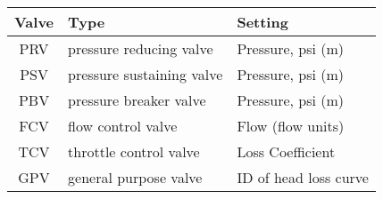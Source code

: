 \begin{tabular}{|c|l|l|}
\hline
Valve& Type& Setting\\
\hline
PRV& pressure reducing valve  & Pressure, psi (m)\\
PSV& pressure sustaining valve& Pressure, psi (m)\\
PBV& pressure breaker valve   & Pressure, psi (m)\\
FCV& flow control valve       & Flow (flow units)\\
TCV& throttle control valve   & Loss Coefficient \\
GPV& general purpose valve    & ID of head loss curve\\
\hline
\end{tabular}
